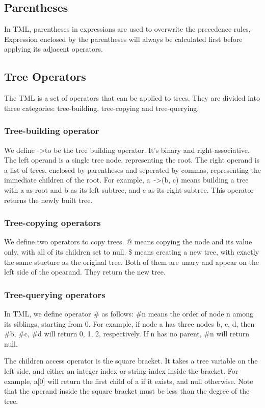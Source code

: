 \documentclass[12pt,psfig,a4]{article}
\begin{document}
\subsection{Parentheses}
In TML, parentheses in expressions are used to overwrite the precedence rules, Expression enclosed by the parentheses will always be calculated first before applying its adjacent operators.

\subsection{Tree Operators}
The TML is a set of operators that can be applied to trees. They are divided into three categories: tree-building, tree-copying and tree-querying.

\subsubsection{Tree-building operator}
We define -\textgreater to be the tree building operator. It's binary and right-associative. The left operand is a single tree node, representing the root. The right operand is a list of trees, enclosed by parentheses and seperated by commas, representing the immediate children of the root. For example, a~-\textgreater(b, c) means building a tree with a as root and b as its left subtree, and c as its right subtree. This operator returns the newly built tree.

\subsubsection{Tree-copying operators}
We define two operators to copy trees. @ means copying the node and its value only, with all of its children set to null. \$ means creating a new tree, with exactly the same stucture as the original tree. Both of them are unary and appear on the left side of the opearand. They return the new tree.

\subsubsection{Tree-querying operators}
\label{treeOp}
In TML, we define operator \# as follows: \#n means the order of node n among its siblings, starting from 0. For example, if node a has three nodes b, c, d, then \#b, \#c, \#d will return 0, 1, 2, respectively. If n has no parent, \#n will return null. 

The children access operator is the square bracket. It takes a tree variable on the left side, and either an integer index or string index inside the bracket. For example, a[0] will return the first child of a if it exists, and null otherwise. Note that the operand inside the square bracket must be less than the degree of the tree. 
\end{document}
